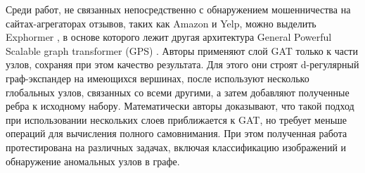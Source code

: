 Среди работ, не связанных непосредственно с обнаружением мошенничества на сайтах-агрегаторах отзывов, таких как Amazon и Yelp, можно выделить Exphormer \cite{shirzad2023}, в основе которого лежит другая архитектура General Powerful Scalable graph transformer (GPS) \cite{rampavsek2022}. Авторы применяют слой GAT только к части узлов, сохраняя при этом качество результата. Для этого они строят d-регулярный граф-экспандер на имеющихся вершинах, после используют несколько глобальных узлов, связанных со всеми другими, а затем добавляют полученные ребра к исходному набору. Математически авторы доказывают, что такой подход при использовании нескольких слоев приближается к GAT, но требует меньше операций для вычисления полного самовнимания. При этом полученная работа протестирована на различных задачах, включая классификацию изображений и обнаружение аномальных узлов в графе.

\pagebreak
